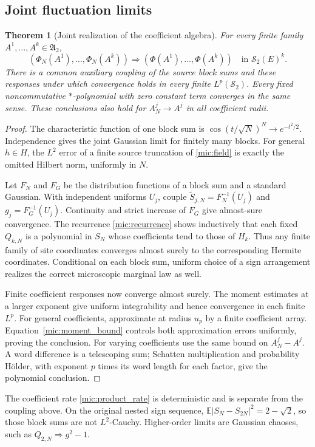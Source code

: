 \documentclass[11pt,a4paper]{amsart}
\numberwithin{equation}{section}
\newtheorem{theorem}{Theorem}[section]
\theoremstyle{definition}
\theoremstyle{remark}
\newcommand{\E}{\mathbb E}
\newcommand{\Sch}{\mathcal S}
\newcommand{\Alg}{\mathfrak A}
\begin{document}
\subsection{Joint fluctuation limits}
\begin{theorem}[Joint realization of the coefficient algebra]\label{mic:clt}
For every finite family $A^1,\ldots,A^k\in\Alg_2$,
\begin{equation}\label{mic:law_limit}
 (\Phi_N(A^1),\ldots,\Phi_N(A^k))
 \Longrightarrow(\Phi(A^1),\ldots,\Phi(A^k))
 \quad\text{in }\Sch_2(E)^k.
\end{equation}
There is a common auxiliary coupling of the source block sums and these responses under which convergence holds in every finite $L^p(\Sch_2)$. Every fixed noncommutative $*$-polynomial with zero constant term converges in the same sense. These conclusions also hold for $A_N^j\to A^j$ in all coefficient radii.
\end{theorem}
\begin{proof}
The characteristic function of one block sum is
$\cos(t/\sqrt N)^N\to e^{-t^2/2}$. Independence gives the joint Gaussian limit for finitely many blocks. For general $h\in H$, the $L^2$ error of a finite source truncation of \eqref{mic:field} is exactly the omitted Hilbert norm, uniformly in $N$.

Let $F_N$ and $F_G$ be the distribution functions of a block sum and a standard Gaussian. With independent uniforms $U_j$, couple
$\widetilde S_{j,N}=F_N^{-1}(U_j)$ and $g_j=F_G^{-1}(U_j)$.
Continuity and strict increase of $F_G$ give almost-sure convergence. The recurrence \eqref{mic:recurrence} shows inductively that each fixed $Q_{k,N}$ is a polynomial in $S_N$ whose coefficients tend to those of $H_k$. Thus any finite family of site coordinates converges almost surely to the corresponding Hermite coordinates. Conditional on each block sum, uniform choice of a sign arrangement realizes the correct microscopic marginal law as well.

Finite coefficient responses now converge almost surely. The moment estimates at a larger exponent give uniform integrability and hence convergence in each finite $L^p$. For general coefficients, approximate at radius $u_p$ by a finite coefficient array. Equation~\eqref{mic:moment_bound} controls both approximation errors uniformly, proving the conclusion. For varying coefficients use the same bound on $A_N^j-A^j$. A word difference is a telescoping sum; Schatten multiplication and probability H\"older, with exponent $p$ times its word length for each factor, give the polynomial conclusion.
\end{proof}
The coefficient rate \eqref{mic:product_rate} is deterministic and is separate from the coupling above. On the original nested sign sequence,
$\E|S_N-S_{2N}|^2=2-\sqrt2$, so those block sums are not $L^2$-Cauchy. Higher-order limits are Gaussian chaoses, such as $Q_{2,N}\Longrightarrow g^2-1$.
\end{document}
